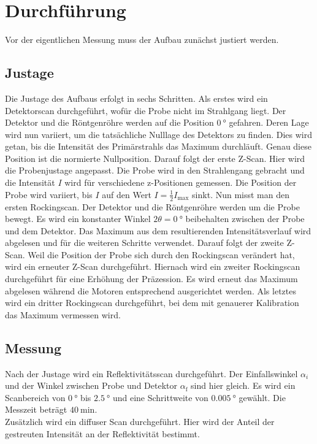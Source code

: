\section{Durchführung}
\label{sec:Durchführung}

Vor der eigentlichen Messung muss der Aufbau zunächst justiert werden. 

\subsection{Justage}

Die Justage des Aufbaus erfolgt in sechs Schritten.
Als erstes wird ein Detektorscan durchgeführt, wofür die Probe nicht im Strahlgang liegt. Der Detektor und die Röntgenröhre werden auf die
Position $\SI{0}{\degree}$ gefahren. Deren Lage wird nun variiert, um die tatsächliche Nulllage des Detektors zu finden. Dies wird getan, bis die Intensität des 
Primärstrahls das Maximum durchläuft. Genau diese Position ist die normierte Nullposition. Darauf folgt der erste Z-Scan.
Hier wird die Probenjustage angepasst. Die Probe wird in den Strahlengang gebracht und die Intensität $I$ wird für verschiedene
z-Positionen gemessen. Die Position der Probe wird variiert, bis $I$ auf den Wert $I = \frac{1}{2}I_\text{max}$ sinkt. Nun misst 
man den ersten Rockingscan. Der Detektor und die Röntgenröhre werden um die Probe bewegt. Es wird ein konstanter Winkel $2\theta = \SI{0}{\degree}$ beibehalten
zwischen der Probe und dem Detektor. Das Maximum aus dem resultierenden Intensitätsverlauf wird abgelesen und für die weiteren Schritte verwendet. 
Darauf folgt der zweite Z-Scan. Weil die Position der Probe sich durch den Rockingscan verändert hat, wird ein erneuter Z-Scan durchgeführt.
Hiernach wird ein zweiter Rockingscan durchgeführt für eine Erhöhung der Präzession. Es wird erneut das Maximum abgelesen während die
Motoren entsprechend ausgerichtet werden. Als letztes wird ein dritter Rockingscan durchgeführt, bei dem mit genauerer Kalibration das
Maximum vermessen wird.

\subsection{Messung}

Nach der Justage wird ein Reflektivitätsscan durchgeführt. Der Einfallswinkel $\alpha_i$ und der Winkel zwischen Probe 
und Detektor $\alpha_\text{f}$ sind hier gleich. Es wird ein Scanbereich von $\SI{0}{\degree}$ bis $\SI{2.5}{\degree}$ und eine Schrittweite 
von $\SI{0.005}{\degree}$ gewählt. Die Messzeit beträgt $\SI{40}{\minute}$. \\
Zusätzlich wird ein diffuser Scan durchgeführt. Hier wird der Anteil der gestreuten Intensität an der Reflektivität bestimmt.
